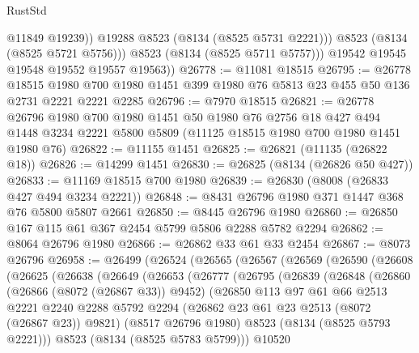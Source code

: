 \begin{lexlean}{RustStd}
\begin{coremodule}
                  @11849
                  @19239))
              @19288
              @8523
              (@8134 (@8525 @5731 @2221)))
            @8523
            (@8134 (@8525 @5721 @5756)))
          @8523
          (@8134 (@8525 @5711 @5757)))
        @19542
        @19545
        @19548
        @19552
        @19557
        @19563))
@26778 := @11081 @18515
@26795 := @26778
    @18515
    @1980
    @700
    @1980
    @1451
    @399
    @1980
    @76
    @5813
    @23
    @455
    @50
    @136
    @2731
    @2221
    @2221
    @2285
@26796 := @7970 @18515
@26821 := @26778
    @26796
    @1980
    @700
    @1980
    @1451
    @50
    @1980
    @76
    @2756
    @18
    @427
    @494
    @1448
    @3234
    @2221
    @5800
    @5809
    (@11125 @18515 @1980 @700 @1980 @1451 @1980 @76)
@26822 := @11155 @1451
@26825 := @26821 (@11135 (@26822 @18))
@26826 := @14299 @1451
@26830 := @26825 (@8134 (@26826 @50 @427))
@26833 := @11169 @18515 @700 @1980
@26839 := @26830 (@8008 (@26833 @427 @494 @3234 @2221))
@26848 := @8431 @26796 @1980 @371 @1447 @368 @76 @5800 @5807 @2661
@26850 := @8445 @26796 @1980
@26860 := @26850 @167 @115 @61 @367 @2454 @5799 @5806 @2288 @5782 @2294
@26862 := @8064 @26796 @1980
@26866 := @26862 @33 @61 @33 @2454
@26867 := @8073 @26796
@26958 := @26499
    (@26524
      (@26565
        (@26567
          (@26569
            (@26590
              (@26608
                (@26625
                  (@26638
                    (@26649
                      (@26653
                        (@26777
                          (@26795
                            (@26839
                              (@26848
                                (@26860
                                  (@26866 (@8072 (@26867 @33)) @9452)
                                  (@26850
                                    @113
                                    @97
                                    @61
                                    @66
                                    @2513
                                    @2221
                                    @2240
                                    @2288
                                    @5792
                                    @2294
                                    (@26862 @23 @61 @23 @2513 (@8072 (@26867 @23)) @9821)
                                    (@8517 @26796 @1980)
                                    @8523
                                    (@8134 (@8525 @5793 @2221)))
                                  @8523
                                  (@8134 (@8525 @5783 @5799)))
                                @10520

\end{coremodule}
\end{lexlean}
